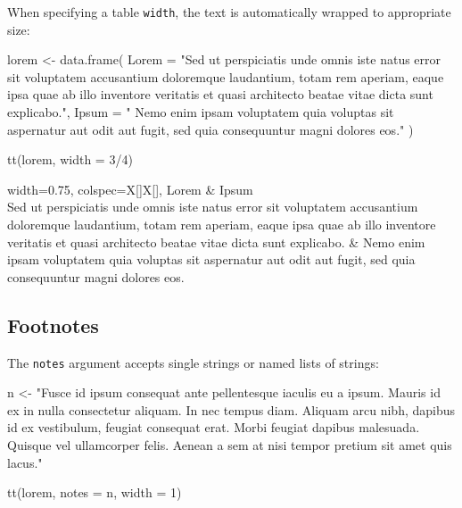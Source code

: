 \documentclass[
  letterpaper,
  DIV=11,
  numbers=noendperiod]{scrartcl}
\newenvironment{Shaded}{\begin{snugshade}}{\end{snugshade}}
\newcommand{\AttributeTok}[1]{\textcolor[rgb]{0.40,0.45,0.13}{#1}}
\newcommand{\DecValTok}[1]{\textcolor[rgb]{0.68,0.00,0.00}{#1}}
\newcommand{\FunctionTok}[1]{\textcolor[rgb]{0.28,0.35,0.67}{#1}}
\newcommand{\NormalTok}[1]{\textcolor[rgb]{0.00,0.23,0.31}{#1}}
\newcommand{\OtherTok}[1]{\textcolor[rgb]{0.00,0.23,0.31}{#1}}
\newcommand{\SpecialCharTok}[1]{\textcolor[rgb]{0.37,0.37,0.37}{#1}}
\newcommand{\StringTok}[1]{\textcolor[rgb]{0.13,0.47,0.30}{#1}}
\begin{document}
When specifying a table \texttt{width}, the text is automatically
wrapped to appropriate size:

\begin{Shaded}
\begin{Highlighting}[]
\NormalTok{lorem }\OtherTok{\textless{}{-}} \FunctionTok{data.frame}\NormalTok{(}
  \AttributeTok{Lorem =} \StringTok{"Sed ut perspiciatis unde omnis iste natus error sit voluptatem accusantium doloremque laudantium, totam rem aperiam, eaque ipsa quae ab illo inventore veritatis et quasi architecto beatae vitae dicta sunt explicabo."}\NormalTok{,}
  \AttributeTok{Ipsum =} \StringTok{" Nemo enim ipsam voluptatem quia voluptas sit aspernatur aut odit aut fugit, sed quia consequuntur magni dolores eos."}
\NormalTok{)}

\FunctionTok{tt}\NormalTok{(lorem, }\AttributeTok{width =} \DecValTok{3}\SpecialCharTok{/}\DecValTok{4}\NormalTok{)}
\end{Highlighting}
\end{Shaded}

\begin{table}[H]
\centering
\begin{tblr}[         %
]                     %
{                     %
width={0.75\linewidth},
colspec={X[]X[]},
}                     %
\toprule
Lorem & Ipsum \\ \midrule %
Sed ut perspiciatis unde omnis iste natus error sit voluptatem accusantium doloremque laudantium, totam rem aperiam, eaque ipsa quae ab illo inventore veritatis et quasi architecto beatae vitae dicta sunt explicabo. &  Nemo enim ipsam voluptatem quia voluptas sit aspernatur aut odit aut fugit, sed quia consequuntur magni dolores eos. \\
\bottomrule
\end{tblr}
\end{table}

\subsection{Footnotes}\label{footnotes}

The \texttt{notes} argument accepts single strings or named lists of
strings:

\begin{Shaded}
\begin{Highlighting}[]
\NormalTok{n }\OtherTok{\textless{}{-}} \StringTok{"Fusce id ipsum consequat ante pellentesque iaculis eu a ipsum. Mauris id ex in nulla consectetur aliquam. In nec tempus diam. Aliquam arcu nibh, dapibus id ex vestibulum, feugiat consequat erat. Morbi feugiat dapibus malesuada. Quisque vel ullamcorper felis. Aenean a sem at nisi tempor pretium sit amet quis lacus."}

\FunctionTok{tt}\NormalTok{(lorem, }\AttributeTok{notes =}\NormalTok{ n, }\AttributeTok{width =} \DecValTok{1}\NormalTok{)}
\end{Highlighting}
\end{Shaded}
\end{document}
